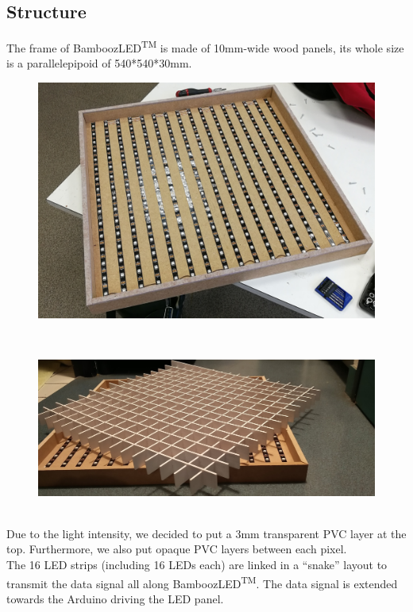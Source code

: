 \documentclass[a4paper,12pt]{article}
\begin{document}
\subsection{Structure}
The frame of BamboozLED\textsuperscript{TM} is made of 10mm-wide wood panels, its whole size is a parallelepipoid of 540*540*30mm.
\begin{figure}[htbp]
	\centering
	\includegraphics[width=\textwidth]{img/pic1}
\end{figure}\\
\begin{figure}[htbp]
	\centering
	\includegraphics[width=\textwidth]{img/pic2}
\end{figure}\\
Due to the light intensity, we decided to put a 3mm transparent PVC layer at the top. Furthermore, we also put opaque PVC layers between each pixel.\\

The 16 LED strips (including 16 LEDs each) are linked in a ``snake'' layout to transmit the data signal all along BamboozLED\textsuperscript{TM}. The data signal is extended towards the Arduino driving the LED panel.
\end{document}
